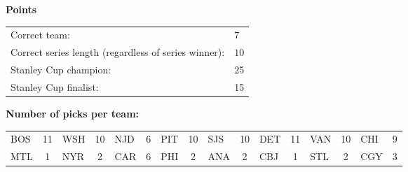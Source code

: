 \documentclass[10pt]{article}
\begin{document}
{\bf Points}\\
\begin{minipage}{12cm}
    \begin{tabular}{l l}
        Correct team:	& $7$\\
        Correct series length (regardless of series winner):	& $10$\\
        Stanley Cup champion:	& 25\\
        Stanley Cup finalist:	& 15\\
    \end{tabular}

    \vspace{1cm}
    {\bf Number of picks per team:}\\
    \begin{tabular}{lc | lc | lc | lc | lc | lc | lc | lc }
        BOS & 11 & WSH & 10 & NJD & 6 & PIT & 10 & SJS & 10 & DET & 11 & VAN & 10 & CHI & 9 \\
        MTL & 1 & NYR & 2 & CAR & 6 & PHI & 2 & ANA & 2 & CBJ & 1 & STL & 2 & CGY & 3 \\
    \end{tabular}
\end{minipage}
\end{document}
